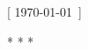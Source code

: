 
\clearpage
\thispagestyle{empty}
\vspace*{\fill}
\noindent
\begin{center}
	\scshape\large
	[ \today\ ]
	\vspace{0.5cm}
	\par
	\noindent
	* * *
\end{center}
\vspace*{\fill}